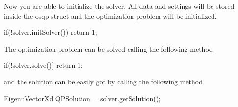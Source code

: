 Now you are able to initialize the solver. All data and settings will be stored inside the osqp struct and the optimization problem will be initialized. 
\begin{DoxyCode}
\textcolor{keywordflow}{if}(!solver.initSolver()) \textcolor{keywordflow}{return} 1;
\end{DoxyCode}


The optimization problem can be solved calling the following method 
\begin{DoxyCode}
\textcolor{keywordflow}{if}(!solver.solve()) \textcolor{keywordflow}{return} 1;
\end{DoxyCode}
 and the solution can be easily got by calling the following method 
\begin{DoxyCode}
Eigen::VectorXd QPSolution = solver.getSolution();
\end{DoxyCode}


